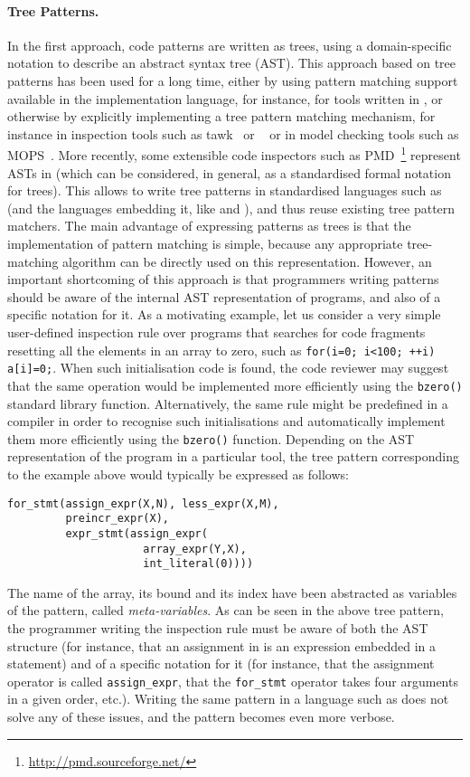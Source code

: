 \paragraph{Tree Patterns.} In the first approach, code patterns
are written as trees, using a domain\hyp{}specific notation to
describe an abstract syntax tree (AST). This approach based on tree
patterns has been used for a long time, either by using pattern
matching support available in the implementation language, for
instance, for tools written in \ML, or otherwise by explicitly
implementing a tree pattern matching mechanism, for instance in
inspection tools such as \textsf{tawk}~\cite{tawk} or
\Scruple~\cite{scruple} or in model checking tools such as
\textsf{MOPS}~\cite{mops}. More recently, some extensible code
inspectors such as
\textsf{PMD}~\footnote{\url{http://pmd.sourceforge.net/}} represent
ASTs in \XML (which can be considered, in general, as a standardised
formal notation for trees). This allows to write tree patterns in
standardised languages such as \XPath (and the languages embedding it,
like \XQuery and \XSLT), and thus reuse existing tree pattern
matchers. The main advantage of expressing patterns as trees is that
the implementation of pattern matching is simple, because any
appropriate tree\hyp{}matching algorithm can be directly used on this
representation. However, an important shortcoming of this approach is
that programmers writing patterns should be aware of the internal AST
representation of programs, and also of a specific notation for it. As
a motivating example, let us consider a very simple user\hyp{}defined
inspection rule over \Clang programs that searches for code fragments
resetting all the elements in an array to zero, such as
\verb|for(i=0; i<100; ++i) a[i]=0;|. When such initialisation code is
found, the code reviewer may suggest that the same operation would be
implemented more efficiently using the \texttt{bzero()} standard
library function. Alternatively, the same rule might be predefined in
a compiler in order to recognise such initialisations and
automatically implement them more efficiently using the
\texttt{bzero()} function. Depending on the AST representation of the
\Clang program in a particular tool, the tree pattern corresponding to
the example above would typically be expressed as follows:
{\small
\begin{verbatim}
for_stmt(assign_expr(X,N), less_expr(X,M),
         preincr_expr(X),
         expr_stmt(assign_expr(
                     array_expr(Y,X),
                     int_literal(0))))
\end{verbatim}
}
\noindent The name of the array, its bound and its index have been
abstracted as variables of the pattern, called
\emph{meta\hyp{}variables}. As can be seen in the above tree pattern,
the programmer writing the inspection rule must be aware of both the
AST structure (for instance, that an assignment in \Clang is an
expression embedded in a statement) and of a specific notation for it
(for instance, that the assignment operator is called
\texttt{assign\_expr}, that the \texttt{for\_stmt} operator takes four
arguments in a given order, etc.). Writing the same pattern in a
language such as \XPath does not solve any of these issues, and the
pattern becomes even more verbose.

